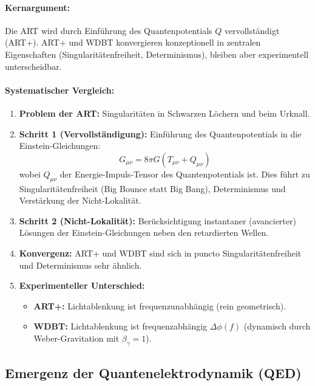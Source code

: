 \documentclass[11pt, a4paper]{article}
\begin{document}
\paragraph{Kernargument:} Die ART wird durch Einführung des Quantenpotentials $Q$ vervollständigt (ART+). ART+ und WDBT konvergieren konzeptionell in zentralen Eigenschaften (Singularitätenfreiheit, Determinismus), bleiben aber experimentell unterscheidbar.

\paragraph{Systematischer Vergleich:}
\begin{enumerate}
    \item \textbf{Problem der ART:} Singularitäten in Schwarzen Löchern und beim Urknall.
    \item \textbf{Schritt 1 (Vervollständigung):} Einführung des Quantenpotentials in die Einstein-Gleichungen:
    \begin{equation}
    \label{eq:einstein_mod}
    G_{\mu\nu} = 8\pi G (T_{\mu\nu} + Q_{\mu\nu})
    \end{equation}
    wobei $Q_{\mu\nu}$ der Energie-Impuls-Tensor des Quantenpotentials ist. Dies führt zu Singularitätenfreiheit (Big Bounce statt Big Bang), Determinismus und Verstärkung der Nicht-Lokalität.
    \item \textbf{Schritt 2 (Nicht-Lokalität):} Berücksichtigung instantaner (avancierter) Lösungen der Einstein-Gleichungen neben den retardierten Wellen.
    \item \textbf{Konvergenz:} ART+ und WDBT sind sich in puncto Singularitätenfreiheit und Determinismus sehr ähnlich.
    \item \textbf{Experimenteller Unterschied:}
    \begin{itemize}
        \item \textbf{ART+:} Lichtablenkung ist frequenzunabhängig (rein geometrisch).
        \item \textbf{WDBT:} Lichtablenkung ist frequenzabhängig $\Delta\phi(f)$ (dynamisch durch Weber-Gravitation mit $\beta_\gamma=1$).
    \end{itemize}
\end{enumerate}

\subsection{Emergenz der Quantenelektrodynamik (QED)}
\label{subsec:emergenz_qed}
\end{document}
